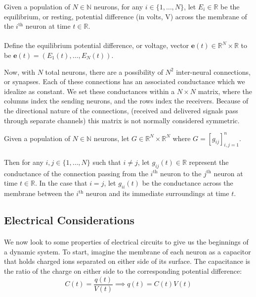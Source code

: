 \documentclass{article}
\begin{document}
\begin{definition}[$\mathbf{e}(t) = \textbf{equilibrium potential vector}$]\label{e}
Given a population of $N\in\mathbb{N}$ neurons, for any $i \in \{ 1, \dots, N \}$, let $E_{i}\in\mathbb{R}$ be the equilibrium, or resting, potential difference (in volts, V) across the membrane of the $i^{\text{th}}$ neuron at time $t\in\mathbb{R}$.\\
\\
Define the equilibrium potential difference, or voltage, vector $\mathbf{e}(t)\in\mathbb{R}^{N}\times\mathbb{R}$ to be $\mathbf{e}(t) = ( E_{1}(t), \dots, E_{N}(t) )$. 
\end{definition}

Now, with $N$ total neurons, there are a possibility of $N^{2}$ inter-neural connections, or synapses. Each of these connections has an associated conductance which we idealize as constant. We set these conductances within a $N\times N$ matrix, where the columns index the sending neurons, and the rows index the receivers. Because of the directional nature of the connections, (received and delivered signals pass through separate channels) this matrix is not normally considered symmetric.

\begin{definition}[$G(t) = \textbf{synapse conductance matrix}$]\label{G}
Given a population of $N\in\mathbb{N}$ neurons, let $G \in \mathbb{R}^{N} \times \mathbb{R}^{N}$ where $G = [g_{ij}]_{i,j=1}^{n}$. \\
\\
Then for any $i,j \in \{ 1, \dots, N \}$ such that $i \ne j$, let $g_{ij}(t) \in \mathbb{R}$ represent the conductance of the connection passing from the $i^{\text{th}}$ neuron to the $j^{\text{th}}$ neuron at time $t\in\mathbb{R}$. In the case that $i=j$, let $g_{ii}(t)$ be the conductance across the membrane between the $i^{\text{th}}$ neuron and its immediate surroundings at time $t$.
\end{definition}

\subsection{Electrical Considerations}

\paragraph{}
We now look to some properties of electrical circuits to give us the beginnings of a dynamic system. To start, imagine the membrane of each neuron as a capacitor that holds charged ions separated on either side of its surface. The capacitance is the ratio of the charge on either side to the corresponding potential difference:
\[ C(t) = \frac{q(t)}{V(t)} \implies q(t) = C(t)V(t) \]
\end{document}
